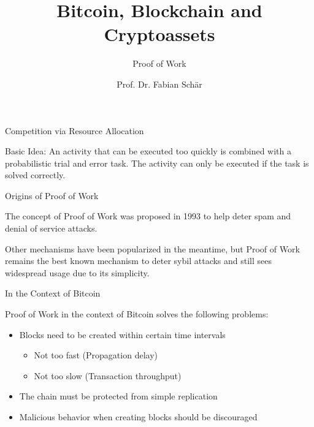 \documentclass[]{beamer}
\title{Bitcoin, Blockchain and Cryptoassets}
\subtitle{Proof of Work}
\author{Prof. Dr. Fabian Schär}
\institute{University of Basel}
\begin{document}
\thispagestyle{empty}
\begin{frame}[noframenumbering]
	\titlepage
\end{frame}

\begin{frame}{Competition via Resource Allocation}

Basic Idea: An activity that can be executed too quickly is \color{focus}combined with a probabilistic trial and error task\color{black}. The activity can only be executed if the task is solved correctly.

\end{frame}

\begin{frame}{Origins of Proof of Work}
	
	The concept of Proof of Work was proposed in 1993 \cite{dwork_pricing_1993} to help deter spam and denial of service attacks. 
	
	\vspace{1.5em}
	
	Other mechanisms have been popularized in the meantime, but Proof of Work remains the best known mechanism to deter sybil attacks and still sees widespread usage due to its simplicity.

\end{frame}

\begin{frame}{In the Context of Bitcoin}

Proof of Work in the context of Bitcoin solves the following problems:

\begin{itemize}
	\item Blocks need to be created within certain time intervals
	\begin{itemize}
		\item Not too fast (Propagation delay)
		\item Not too slow (Transaction throughput)
	\end{itemize}
	\item The chain must be protected from simple replication
	\item Malicious behavior when creating blocks should be discouraged 
\end{itemize}

\end{frame}
\end{document}
